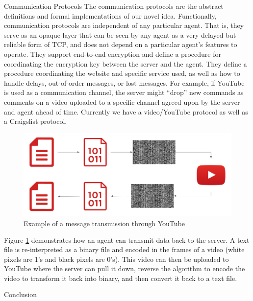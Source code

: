 \documentclass[final]{beamer}
\newlength{\colwidth}
\begin{document}
\begin{frame}[t]
\begin{columns}[t]
\begin{column}{\colwidth}
  \begin{block}{Communication Protocols}
    The communication protocols are the abstract definitions and formal implementations of our novel idea. Functionally, communication protocols are independent of any particular agent.
    That is, they serve as an opaque layer that can be seen by any agent as a very delayed but reliable form of TCP, and does not depend on a particular agent’s features to operate.
    They support end-to-end encryption and define a procedure for coordinating the encryption key between the server and the agent.
    They define a procedure coordinating the website and specific service used, as well as how to handle delays, out-of-order messages, or lost messages. For example, if YouTube is used as a communication channel, the server might “drop” new commands as comments on a video uploaded to a specific channel agreed upon by the server and agent ahead of time.
    Currently we have a video/YouTube protocol as well as a Craigslist protocol.

    \begin{figure}
      \centering
      \includegraphics[width=\textwidth]{images/encode.png}
      \caption{\quad Example of a message transmission through YouTube}
      \label{fig:encode}
    \end{figure}
    Figure \ref{fig:encode} demonstrates how an agent can transmit data back to the server. 
    A text file is re-interpreted as a binary file and encoded in the frames of a video (white pixels are 1's and black pixels are 0's). 
    This video can then be uploaded to YouTube where the server can pull it down, reverse the algorithm to encode the video to transform it back into binary, and then convert it back to a text file.
  \end{block}
  \begin{block}{Conclusion}


\end{block}
\end{column}
\end{columns}
\end{frame}
\end{document}
